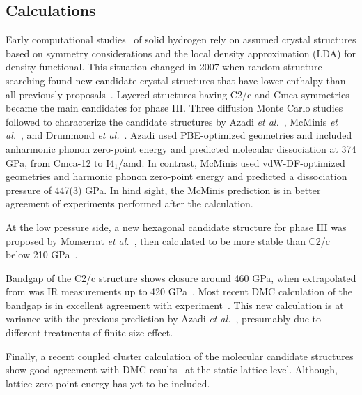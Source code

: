 \subsection{Calculations}
\label{sec:hsolid-calcs}

Early computational studies~\cite{Kaxiras1991,Nagara1992,Mazin1995,Kohanoff1997,Johnson2000} of solid hydrogen rely on assumed crystal structures based on symmetry considerations and the local density approximation (LDA) for density functional. This situation changed in 2007 when random structure searching found new candidate crystal structures that have lower enthalpy than all previously proposals~\cite{Pickard2007}. Layered structures having C2/c and Cmca symmetries became the main candidates for phase III.
Three diffusion Monte Carlo studies followed to characterize the candidate structures by Azadi \textit{et al.}~\cite{Azadi2014}, McMinis \textit{et al.}~\cite{McMinis2015}, and Drummond \textit{et al.}~\cite{Drummond2015}.
Azadi used PBE-optimized geometries and included anharmonic phonon zero-point energy and predicted molecular dissociation at 374 GPa, from Cmca-12 to I4$_1$/amd. In contrast, McMinis used vdW-DF-optimized geometries and harmonic phonon zero-point energy and predicted a dissociation pressure of 447(3) GPa.
In hind sight, the McMinis prediction is in better agreement of experiments performed after the calculation.

At the low pressure side, a new hexagonal candidate structure for phase III was proposed by Monserrat \textit{et al.}~\cite{Monserrat2016}, then calculated to be more stable than C2/c below 210 GPa~\cite{Azadi2019}.

Bandgap of the C2/c structure shows closure around 460 GPa, when extrapolated from  was IR measurements up to 420 GPa~\cite{Loubeyre2020}. Most recent DMC calculation of the bandgap is in excellent agreement with experiment~\cite{Gorelov2019}. This new calculation is at variance with the previous prediction by Azadi \textit{et al.}~\cite{Azadi2019}, presumably due to different treatments of finite-size effect.

Finally, a recent coupled cluster calculation of the molecular candidate structures show good agreement with DMC results~\cite{Liao2019} at the static lattice level. Although, lattice zero-point energy has yet to be included.

